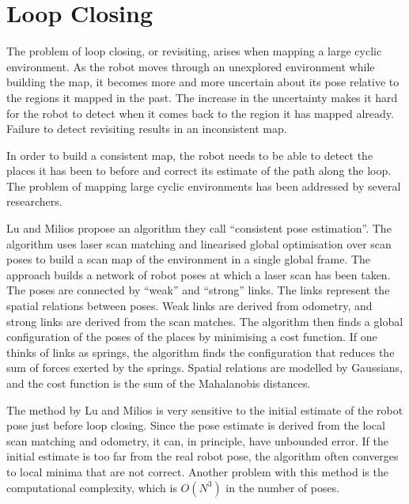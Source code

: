 

\section{Loop Closing}
\label{sec:back_loop}

The problem of loop closing, or revisiting, arises when mapping a
large cyclic environment. As the robot moves through an unexplored
environment while building the map, it becomes more and more uncertain
about its pose relative to the regions it mapped in the past. The
increase in the uncertainty makes it hard for the robot to detect when
it comes back to the region it has mapped already. Failure to detect
revisiting results in an inconsistent map.

In order to build a consistent map, the robot needs to be able to
detect the places it has been to before and correct its estimate of
the path along the loop. The problem of mapping large cyclic
environments has been addressed by several researchers.




Lu and Milios \cite{lu97:_global} propose an algorithm they call
``consistent pose estimation''. The algorithm uses laser scan matching
and linearised global optimisation over scan poses to build a scan map
of the environment in a single global frame. The approach builds a
network of robot poses at which a laser scan has been taken. The poses
are connected by ``weak'' and ``strong'' links. The links represent
the spatial relations between poses. Weak links are derived from
odometry, and strong links are derived from the scan matches. The
algorithm then finds a global configuration of the poses of the places
by minimising a cost function. If one thinks of links as springs, the
algorithm finds the configuration that reduces the sum of forces
exerted by the springs. Spatial relations are modelled by Gaussians,
and the cost function is the sum of the Mahalanobis distances.

The method by Lu and Milios is very sensitive to the initial estimate
of the robot pose just before loop closing. Since the pose estimate is
derived from the local scan matching and odometry, it can, in
principle, have unbounded error. If the initial estimate is too far
from the real robot pose, the algorithm often converges to local
minima that are not correct. Another problem with this method is the
computational complexity, which is $O(N^3)$ in the number of poses.

